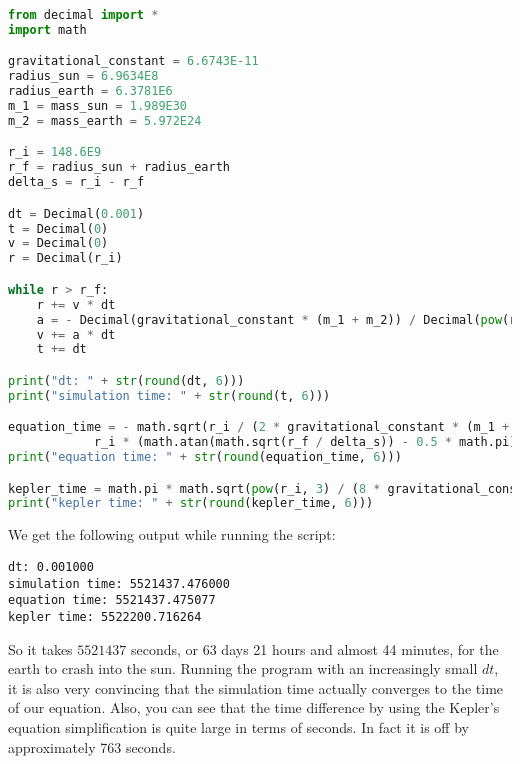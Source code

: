 \documentclass{article}
\begin{document}
\begin{lstlisting}[language=Python]
from decimal import *
import math

gravitational_constant = 6.6743E-11
radius_sun = 6.9634E8
radius_earth = 6.3781E6
m_1 = mass_sun = 1.989E30
m_2 = mass_earth = 5.972E24

r_i = 148.6E9
r_f = radius_sun + radius_earth
delta_s = r_i - r_f

dt = Decimal(0.001)
t = Decimal(0)
v = Decimal(0)
r = Decimal(r_i)

while r > r_f:
    r += v * dt
    a = - Decimal(gravitational_constant * (m_1 + m_2)) / Decimal(pow(r, 2))
    v += a * dt
    t += dt

print("dt: " + str(round(dt, 6)))
print("simulation time: " + str(round(t, 6)))

equation_time = - math.sqrt(r_i / (2 * gravitational_constant * (m_1 + m_2))) * (
            r_i * (math.atan(math.sqrt(r_f / delta_s)) - 0.5 * math.pi) - math.sqrt(r_f * delta_s))
print("equation time: " + str(round(equation_time, 6)))

kepler_time = math.pi * math.sqrt(pow(r_i, 3) / (8 * gravitational_constant * (m_1 + m_2)))
print("kepler time: " + str(round(kepler_time, 6)))    
\end{lstlisting}
We get the following output while running the script:
\begin{lstlisting}
dt: 0.001000
simulation time: 5521437.476000
equation time: 5521437.475077
kepler time: 5522200.716264
\end{lstlisting}
So it takes $5521437$ seconds, or 63 days 21 hours and almost 44 minutes, for the earth to crash into the sun. Running the program with an increasingly small $dt$, it is also very convincing that the simulation time actually converges to the time of our equation. Also, you can see that the time difference by using the Kepler's equation simplification is quite large in terms of seconds. In fact it is off by approximately 763 seconds. 
\end{document}
